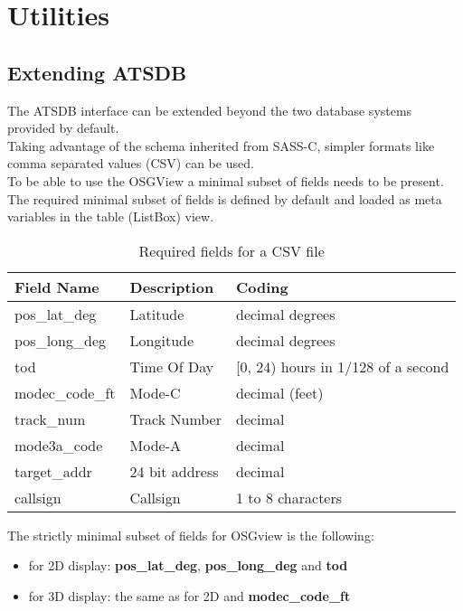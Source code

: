 \chapter{Utilities}
\label{sec:utils}

\section{Extending ATSDB}
\label{sec:Extending ATSDB}

The ATSDB interface can be extended beyond the two database systems provided by default. \\

Taking advantage of the schema inherited from SASS-C, simpler formats like comma separated values (CSV) can be used. \\

To be able to use the OSGView a minimal subset of fields needs to be present. The required minimal subset of fields is defined by default and loaded as meta variables in the table (ListBox) view. \\

\begin{table}[H]
  \center
  \begin{tabular}{ | l | l | l |}
    \hline
    \textbf{Field Name} & \textbf{Description} & \textbf{Coding} \\ \hline
    pos\_lat\_deg & Latitude & decimal degrees \\ \hline
    pos\_long\_deg & Longitude & decimal degrees \\ \hline
    tod & Time Of Day & [0, 24) hours in 1/128 of a second \\ \hline
    modec\_code\_ft & Mode-C & decimal (feet) \\ \hline
    track\_num & Track Number & decimal \\ \hline
    mode3a\_code & Mode-A & decimal \\ \hline
    target\_addr & 24 bit address & decimal \\ \hline
    callsign & Callsign & 1 to 8 characters \\ \hline
  \end{tabular}
  \caption{Required fields for a CSV file}
\end{table}

The strictly minimal subset of fields for OSGview is the following:
\begin{itemize}
\item for 2D display: \textbf{pos\_lat\_deg}, \textbf{pos\_long\_deg} and \textbf{tod}
\item for 3D display: the same as for 2D and \textbf{modec\_code\_ft}
\\
\end{itemize}

